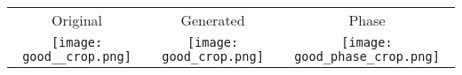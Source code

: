 \begin{tabular}{c @{\hskip 0pt} c @{\hskip 0pt} c }
    Original & Generated & Phase\\
    \texttt{[image: good\_\_crop.png]}&
    \texttt{[image: good\_crop.png]}&
    \texttt{[image: good\_phase\_crop.png]}
\end{tabular}